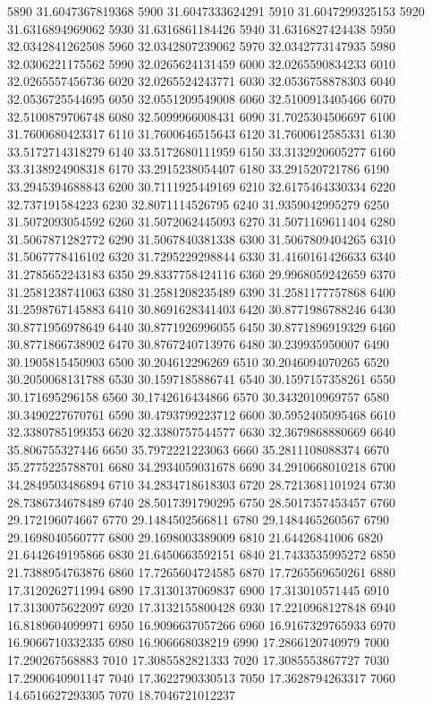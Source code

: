 {5890 31.6047367819368
5900 31.6047333624291
5910 31.6047299325153
5920 31.6316894969062
5930 31.6316861184426
5940 31.6316827424438
5950 32.0342841262508
5960 32.0342807239062
5970 32.0342773147935
5980 32.0306221175562
5990 32.0265624131459
6000 32.0265590834233
6010 32.0265557456736
6020 32.0265524243771
6030 32.0536758878303
6040 32.0536725544695
6050 32.0551209549008
6060 32.5100913405466
6070 32.5100879706748
6080 32.5099966008431
6090 31.7025304506697
6100 31.7600680423317
6110 31.7600646515643
6120 31.7600612585331
6130 33.5172714318279
6140 33.5172680111959
6150 33.3132920605277
6160 33.3138924908318
6170 33.2915238054407
6180 33.291520721786
6190 33.2945394688843
6200 30.7111925449169
6210 32.6175464330334
6220 32.737191584223
6230 32.8071114526795
6240 31.9359042995279
6250 31.5072093054592
6260 31.5072062445093
6270 31.5071169611404
6280 31.5067871282772
6290 31.5067840381338
6300 31.5067809404265
6310 31.5067778416102
6320 31.7295229298844
6330 31.4160161426633
6340 31.2785652243183
6350 29.8337758424116
6360 29.9968059242659
6370 31.2581238741063
6380 31.2581208235489
6390 31.2581177757868
6400 31.2598767145883
6410 30.8691628341403
6420 30.8771986788246
6430 30.8771956978649
6440 30.8771926996055
6450 30.8771896919329
6460 30.8771866738902
6470 30.8767240713976
6480 30.239935950007
6490 30.1905815450903
6500 30.204612296269
6510 30.2046094070265
6520 30.2050068131788
6530 30.1597185886741
6540 30.1597157358261
6550 30.171695296158
6560 30.1742616434866
6570 30.3432010969757
6580 30.3490227670761
6590 30.4793799223712
6600 30.5952405095468
6610 32.3380785199353
6620 32.3380757544577
6630 32.3679868880669
6640 35.806755327446
6650 35.7972221223063
6660 35.2811108088374
6670 35.2775225788701
6680 34.2934059031678
6690 34.2910668010218
6700 34.2849503486894
6710 34.2834718618303
6720 28.7213681101924
6730 28.7386734678489
6740 28.5017391790295
6750 28.5017357453457
6760 29.172196074667
6770 29.1484502566811
6780 29.1484465260567
6790 29.1698040560777
6800 29.1698003389009
6810 21.64426841006
6820 21.6442649195866
6830 21.6450663592151
6840 21.7433535995272
6850 21.7388954763876
6860 17.7265604724585
6870 17.7265569650261
6880 17.3120262711994
6890 17.3130137069837
6900 17.313010571445
6910 17.3130075622097
6920 17.3132155800428
6930 17.2210968127848
6940 16.8189604099971
6950 16.9096637057266
6960 16.9167329765933
6970 16.9066710332335
6980 16.906668038219
6990 17.2866120740979
7000 17.290267568883
7010 17.3085582821333
7020 17.3085553867727
7030 17.2900640901147
7040 17.3622790330513
7050 17.3628794263317
7060 14.6516627293305
7070 18.7046721012237
}
